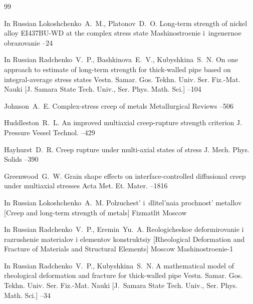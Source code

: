 \begin{thebibliography}{99}

\lang In Russian
\by Lokoshchenko~A.~M., Platonov~D.~O.
\paper Long-term strength of nickel alloy EI437BU-WD at the complex stress state
\jour Mashinostroenie i~ingenernoe obrazovanie
--24


\lang In Russian
\by Radchenko~V.~P., Bashkinova~E.~V., Kubyshkina~S.~N.
\paper On one approach to estimate of long-term strength for thick-walled pipe based on integral-average stress states
\jour Vestn. Samar. Gos. Tekhn. Univ. Ser. Fiz.-Mat. Nauki \rm [J. Samara State Tech. Univ., Ser. Phys. Math. Sci.]
--104


\by Johnson~A.~E.
\paper Complex-stress creep of metals
\jour Metallurgical Reviews
--506

\by Huddleston~R.~L. 
\paper An improved multiaxial creep-rupture strength criterion
\jour J. Pressure Vessel Technol.
--429

\by Hayhurst~D.~R. 
\paper Creep rupture under multi-axial states of stress
\jour J. Mech. Phys. Solids
--390

\by Greenwood~G.~W.
\paper Grain shape effects on interface-controlled diffusional creep under multiaxial stresses
\jour Acta Met. Et. Mater.
--1816

\lang In Russian
\by Lokoshchenko~A.~M.
\book Polzuchest' i~dlitel'naia prochnost' metallov \rm [Creep and long-term strength of metals]
\publ Fizmatlit
\publaddr Moscow


\lang In Russian
\by Radchenko~V.~P., Eremin~Yu.~A.
\book Reologicheskoe deformirovanie i razrushenie materialov i elementov konstruktsiy  \rm [Rheological Deformation and Fracture of Materials and Structural Elements]
\publaddr Moscow
\publ Mashinostroenie-1

\lang In Russian
\by Radchenko~V.~P., Kubyshkina~S.~N.
\paper A mathematical model of rheological deformation and fracture for thick-walled pipe
\jour  Vestn. Samar. Gos. Tekhn. Univ. Ser. Fiz.-Mat. Nauki \rm  [J.~Samara State Tech. Univ., Ser. Phys. Math. Sci.]
--34




\end{thebibliography}
